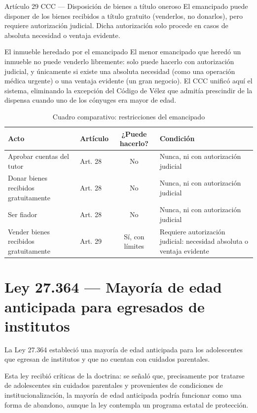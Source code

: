 \documentclass[12pt,oneside]{book}
\begin{document}
\begin{definition}{Artículo 29 CCC — Disposición de bienes a título oneroso}
El emancipado puede disponer de los bienes recibidos a título gratuito (venderlos, no donarlos), pero requiere autorización judicial. Dicha autorización solo procede en casos de absoluta necesidad o ventaja evidente.
\end{definition}

\begin{example}{El inmueble heredado por el emancipado}
El menor emancipado que heredó un inmueble no puede venderlo libremente: solo puede hacerlo con autorización judicial, y únicamente si existe una absoluta necesidad (como una operación médica urgente) o una ventaja evidente (un gran negocio). El CCC unificó aquí el sistema, eliminando la excepción del Código de Vélez que admitía prescindir de la dispensa cuando uno de los cónyuges era mayor de edad.
\end{example}

\begin{table}[H]
\centering
\caption{Cuadro comparativo: restricciones del emancipado}
\begin{tabularx}{\textwidth}{Xlcl}
\toprule
\textbf{Acto} & \textbf{Artículo} & \textbf{¿Puede hacerlo?} & \textbf{Condición} \\
\midrule
Aprobar cuentas del tutor & Art. 28 & No & Nunca, ni con autorización judicial \\
Donar bienes recibidos gratuitamente & Art. 28 & No & Nunca, ni con autorización judicial \\
Ser fiador & Art. 28 & No & Nunca, ni con autorización judicial \\
Vender bienes recibidos gratuitamente & Art. 29 & Sí, con límites & Requiere autorización judicial: necesidad absoluta o ventaja evidente \\
\bottomrule
\end{tabularx}
\end{table}

\section{Ley 27.364 — Mayoría de edad anticipada para egresados de institutos}

La Ley 27.364 estableció una mayoría de edad anticipada para los adolescentes que egresan de institutos y que no cuentan con cuidados parentales.

\begin{note}
Esta ley recibió críticas de la doctrina: se señaló que, precisamente por tratarse de adolescentes sin cuidados parentales y provenientes de condiciones de institucionalización, la mayoría de edad anticipada podría funcionar como una forma de abandono, aunque la ley contempla un programa estatal de protección.
\end{note}
\end{document}
